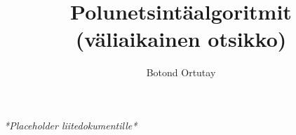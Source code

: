 \documentclass[language=finnish,version=final,mainfont=none,sharelatex=false]{utuftthesis}
\providecommand{\algorithmname}{Algoritmi}
\begin{document}
\title{Polunetsintäalgoritmit (väliaikainen otsikko)}
\author{Botond Ortutay}

\maketitle


\tableofcontents


\listoftables


\renewcommand{\algorithmname}{\listingscaption}


\begin{comment}
To better organize things, create a new tex file for each chapter
and input it below.

Avoid using the å, ä, ö or <space> characters in referred names and
underscores \_ in file names (may break hyperref).

Good luck!
\end{comment}









\printbibliography

\begin{comment}
Important! Create the appendix chapters with command \textbackslash appchapter\{some
name\} instead of \textbackslash chapter\{some name\} for the automagic
page counting to work!
\end{comment}



\textit{*Placeholder liitedokumentille*}
\end{document}
